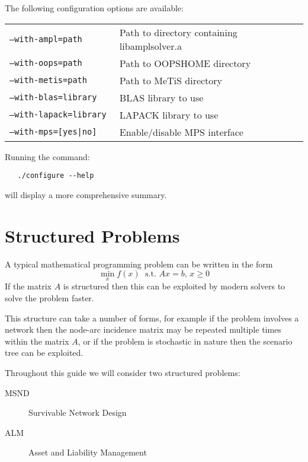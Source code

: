 \documentclass[10pt,a4paper]{report}
\begin{document}
The following configuration options are available:

\begin{tabular}{ll}
   \tt --with-ampl=path & Path to directory containing libamplsolver.a \\
   \tt --with-oops=path & Path to OOPSHOME directory \\
   \tt --with-metis=path & Path to MeTiS directory \\
   \tt --with-blas=library & BLAS library to use \\
   \tt --with-lapack=library & LAPACK library to use \\
   \tt --with-mps=[yes|no] & Enable/disable MPS interface
\end{tabular}

Running the command:
\begin{verbatim}
   ./configure --help
\end{verbatim}
will display a more comprehensive summary.

\chapter{Structured Problems}
\label{background}

A typical mathematical programming problem can be written in the form
\begin{equation}
\min_x f(x)\; \text{~s.t.~} Ax=b,\, x\ge 0
\end{equation}
If the matrix $A$ is structured then this can be exploited by modern solvers
to solve the problem faster.

This structure can take a number of forms, for example if the problem involves
a network then the node-arc incidence matrix may be repeated multiple times
within the matrix $A$, or if the problem is stochastic in nature then the
scenario tree can be exploited.

Throughout this guide we will consider two structured problems:
\begin{description}
   \item[MSND] Survivable Network Design
   \item[ALM] Asset and Liability Management
\end{description}
\end{document}
